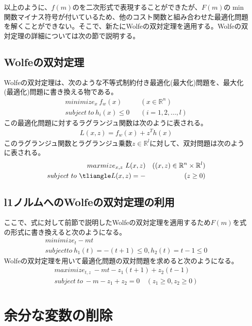 \documentclass[paper]{ieicej}
\begin{document}
以上のように、$f(m)$のを二次形式で表現することができたが、$F(m)$の$\min$関数マイナス符号が付いているため、他のコスト関数と組み合わせた最適化問題を解くことができない。そこで、新たにWolfeの双対定理を適用する。Wolfeの双対定理の詳細については次の節で説明する。
\subsection{Wolfeの双対定理}
Wolfeの双対定理は、次のような不等式制約付き最適化(最大化)問題を、最大化(最適化)問題に書き換える物である。
\begin{eqnarray}
 minimize_{x} \ f_{w}(x) & & (x\in\mathbb{R}^{n}) \nonumber \\
 subject \ to \ h_{i}(x) \leq 0 & & (i=1,2,\dots,l)
\end{eqnarray}
この最適化問題に対するラグランジュ関数は次のように表される。
\begin{eqnarray}
 L(x,z) = f_{w}(x)+z^{T}h(x)
\end{eqnarray}
このラグランジュ関数とラグランジュ乗数$z\in\mathbb{R}^{l}$に対して、双対問題は次のように表される。
\begin{eqnarray}
 maxmize_{x,z} \ L(x,z) & & ((x,z)\in\mathbb{R}^{n}\times\mathbb{R}^{l}) \nonumber \\
 subject \ to \ \tliangle L(x,z) = - & & (z\geq 0)
\end{eqnarray}

\subsection{l1ノルムへのWolfeの双対定理の利用}
ここで、式に対して前節で説明したWolfeの双対定理を適用するため$F(m)$を式の形式に書き換えると次のようになる。
\begin{eqnarray}
 minimize_{t} -mt \nonumber \\
 subject to \ h_{1}(t) = -(t+1) \leq 0,h_{2}(t) = t-1 \leq 0
\end{eqnarray}
Wolfeの双対定理を用いて最適化問題の双対問題を求めると次のようになる。
\begin{eqnarray}
 maximize_{t,z} \ -mt-z_{1}(t+1)+z_{2}(t-1) \nonumber \\
 subject \ to \ -m-z_{1}+z_{2}=0 \quad (z_{1}\geq 0,z_{2}\geq 0)
\end{eqnarray}

\section{余分な変数の削除}


\ack %

%
%
\begin{thebibliography}{99}%
\bibitem{}
\end{thebibliography}

\appendix
\section{}

\begin{biography}
\end{biography}
\end{document}
